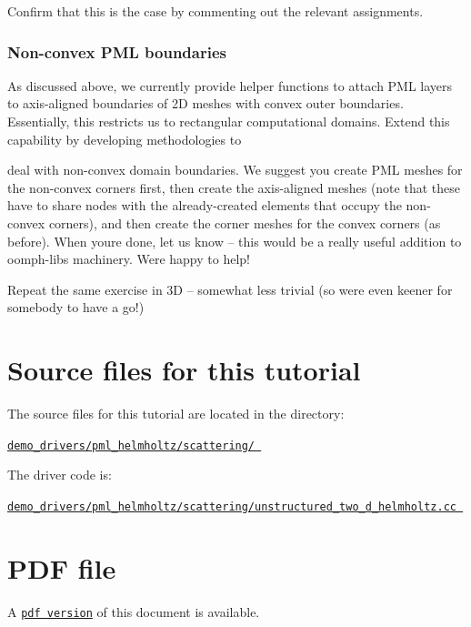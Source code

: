 Confirm that this is the case by commenting out the relevant assignments.\hypertarget{index_non_convex}{}\subsubsection{Non-\/convex P\+M\+L boundaries}\label{index_non_convex}
As discussed above, we currently provide helper functions to attach P\+ML layers to axis-\/aligned boundaries of 2D meshes with convex outer boundaries. Essentially, this restricts us to rectangular computational domains. Extend this capability by developing methodologies to
\begin{DoxyItemize}
\item deal with non-\/convex domain boundaries. We suggest you create P\+ML meshes for the non-\/convex corners first, then create the axis-\/aligned meshes (note that these have to share nodes with the already-\/created elements that occupy the non-\/convex corners), and then create the corner meshes for the convex corners (as before). When you\textquotesingle{}re done, let us know -- this would be a really useful addition to oomph-\/lib\textquotesingle{}s machinery. We\textquotesingle{}re happy to help!
\item Repeat the same exercise in 3D -- somewhat less trivial (so we\textquotesingle{}re even keener for somebody to have a go!)
\end{DoxyItemize}\hypertarget{index_sources}{}\section{Source files for this tutorial}\label{index_sources}

\begin{DoxyItemize}
\item The source files for this tutorial are located in the directory\+: \begin{center} \href{../../../../demo_drivers/pml_helmholtz/scattering}{\tt demo\+\_\+drivers/pml\+\_\+helmholtz/scattering/ } \end{center} 
\item The driver code is\+: \begin{center} \href{../../../../demo_drivers/pml_helmholtz/scattering/unstructured_two_d_helmholtz.cc}{\tt demo\+\_\+drivers/pml\+\_\+helmholtz/scattering/unstructured\+\_\+two\+\_\+d\+\_\+helmholtz.\+cc } \end{center} 
\end{DoxyItemize}



 

 \hypertarget{index_pdf}{}\section{P\+D\+F file}\label{index_pdf}
A \href{../latex/refman.pdf}{\tt pdf version} of this document is available. 
